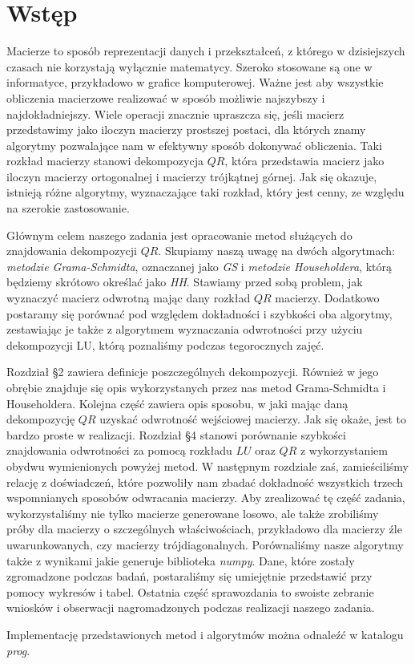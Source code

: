 \section{Wstęp}
Macierze to sposób reprezentacji danych i przekształceń, z którego w dzisiejszych
czasach nie korzystają wyłącznie matematycy. Szeroko stosowane są one
w informatyce, przykładowo w grafice komputerowej. Ważne jest aby wszystkie
obliczenia macierzowe realizować w sposób możliwie najszybszy i najdokładniejszy.
Wiele operacji znacznie upraszcza się, jeśli macierz przedstawimy jako
iloczyn macierzy prostszej postaci, dla których znamy algorytmy pozwalające
nam w efektywny sposób dokonywać obliczenia. Taki rozkład macierzy stanowi
dekompozycja $QR$, która przedstawia macierz jako iloczyn macierzy ortogonalnej
i macierzy trójkątnej górnej. Jak się okazuje, istnieją różne algorytmy,
wyznaczające taki rozkład, który jest cenny, ze względu na szerokie zastosowanie.

Głównym celem naszego zadania jest opracowanie metod służących do
znajdowania dekompozycji $QR$. Skupiamy naszą uwagę na dwóch algorytmach: \textit{metodzie Grama-Schmidta},
oznaczanej jako \textit{GS}
i \textit{metodzie Householdera},
którą będziemy skrótowo określać jako \textit{HH}. Stawiamy przed sobą problem, jak wyznaczyć
macierz odwrotną mając dany rozkład $QR$ macierzy. Dodatkowo postaramy się
porównać pod względem dokładności i szybkości oba algorytmy,
zestawiając je także z algorytmem wyznaczania odwrotności przy użyciu
dekompozycji LU, którą poznaliśmy podczas tegorocznych zajęć.

Rozdział \S2 zawiera definicje poszczególnych dekompozycji. Również w jego
obrębie znajduje się opis wykorzystanych przez nas metod Grama-Schmidta i Householdera.
Kolejna część zawiera opis sposobu, w jaki mając daną dekompozycję $QR$
uzyskać odwrotność wejściowej macierzy. Jak się okaże, jest to bardzo proste
w realizacji. Rozdział \S4 stanowi porównanie szybkości znajdowania
odwrotności za pomocą rozkładu $LU$ oraz $QR$ z wykorzystaniem obydwu
wymienionych powyżej metod. W następnym rozdziale zaś, zamieściliśmy
relację z doświadczeń, które pozwoliły nam zbadać dokładność wszystkich
trzech wspomnianych sposobów odwracania macierzy. Aby zrealizować
tę część zadania, wykorzystaliśmy nie tylko macierze generowane losowo, ale
także zrobiliśmy próby dla macierzy o szczególnych właściwościach,
przykładowo dla macierzy źle uwarunkowanych, czy macierzy trójdiagonalnych.
Porównaliśmy nasze algorytmy także z wynikami jakie generuje biblioteka \textit{numpy}.
Dane, które zostały zgromadzone podczas badań, postaraliśmy się
umiejętnie przedstawić przy pomocy wykresów i tabel.
Ostatnia część sprawozdania to swoiste zebranie wniosków i obserwacji
nagromadzonych podczas realizacji naszego zadania.

Implementację przedstawionych metod i algorytmów można odnaleźć w katalogu \textit{prog}.




